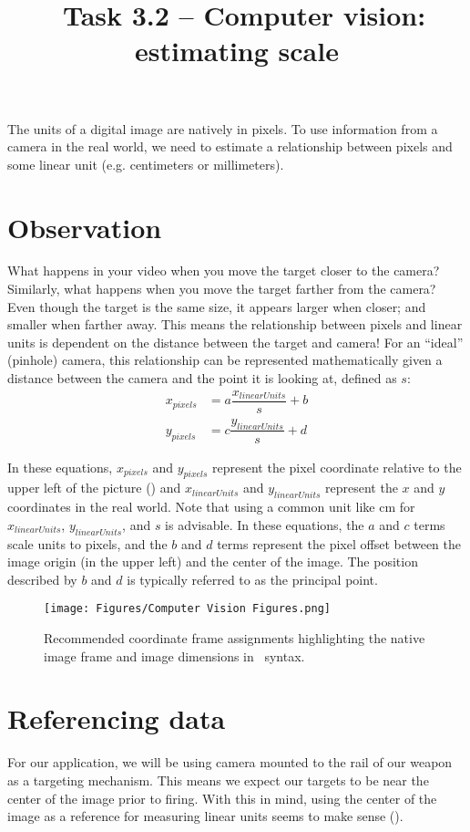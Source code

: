\documentclass{tufte-handout}
\title{\usnaCourseNumber\ Task 3.2 -- Computer vision: estimating scale}
\author{\usnaInstructorShort}
\date{\printdate{\courseWeekTwo}}
\begin{document}
\maketitle
The units of a digital image are natively in pixels. To use information from a camera in the real world, we need to estimate a relationship between pixels and some linear unit (e.g. centimeters or millimeters).

\section{Observation}
What happens in your video when you move the target closer to the camera? Similarly, what happens when you move the target farther from the camera? Even though the target is the same size, it appears larger when closer; and smaller when farther away. This means the relationship between pixels and linear units is dependent on the distance between the target and camera!
For an ``ideal'' (pinhole) camera, this relationship can be represented mathematically given a distance between the camera and the point it is looking at, defined as $s$:
\begin{align}
x_{pixels} &= a \dfrac{x_{linearUnits}}{s} + b \\
y_{pixels} &= c \dfrac{y_{linearUnits}}{s} + d
\end{align}

In these equations, $x_{pixels}$ and $y_{pixels}$ represent the pixel coordinate relative to the upper left of the picture () and $x_{linearUnits}$ and $y_{linearUnits}$ represent the  $x$ and $y$ coordinates in the real world. Note that using a common unit like \si{\centi\meter} for $x_{linearUnits}$, $y_{linearUnits}$, and $s$ is advisable. In these equations, the $a$ and $c$  terms scale units to pixels, and the $b$ and $d$ terms represent the pixel offset between the image origin (in the upper left) and the center of the image. The position described by $b$ and $d$ is typically referred to as the principal point. 

\begin{figure}
\begin{center}
\texttt{[image: Figures/Computer Vision Figures.png]}
\end{center}
\caption{Recommended coordinate frame assignments highlighting the native image frame and image dimensions in \Matlab\ syntax.}
\label{fig:1}
\end{figure}


\section{Referencing data}
For our application, we will be using camera mounted to the rail of our weapon as a targeting mechanism. This means we expect our targets to be near the center of the image prior to firing. With this in mind, using the center of the image as a reference for measuring linear units seems to make sense ().
\end{document}
